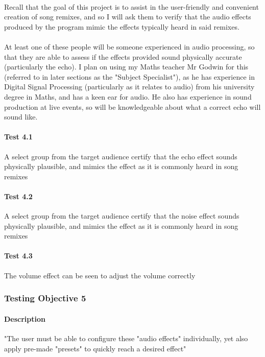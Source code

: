 \paragraph{}
Recall that the goal of this project is to assist in the user-friendly and convenient creation of song remixes, and so I will ask them to verify that the audio effects produced by the program mimic the effects typically heard in said remixes.

\paragraph{}
At least one of these people will be someone experienced in audio processing, so that they are able to assess if the effects provided sound physically accurate
(particularly the echo). I plan on using my Maths teacher Mr Godwin for this (referred to in later sections as the "Subject Specialist"), as he has experience in Digital Signal Processing (particularly as it relates to audio) from his university degree in Maths, and has a keen ear for audio. He also has experience in sound production at live events, so will be knowledgeable about what a correct echo will sound like.

\paragraph{Test 4.1} A select group from the target audience certify that the echo effect sounds physically plausible, and mimics the effect as it is commonly heard in song remixes
\paragraph{Test 4.2} A select group from the target audience certify  that the noise effect sounds physically plausible, and mimics the effect as it is commonly heard in song remixes
\paragraph{Test 4.3} The volume effect can be seen to adjust the volume correctly

\pagebreak
\subsubsection{Testing Objective 5}
\paragraph{Description} "The user must be able to configure these "audio effects" individually, yet also apply pre-made "presets" to quickly reach a desired effect"

